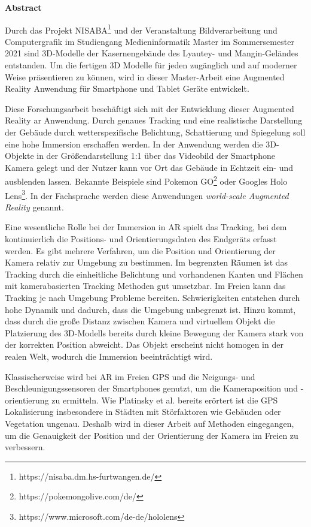 \begin{center}
    \Large
    \textbf{Abstract}
\end{center}

\noindent
Durch das Projekt NISABA\footnote{https://nisaba.dm.hs-furtwangen.de/} und der Veranstaltung Bildverarbeitung und Computergrafik im Studiengang Medieninformatik Master im Sommersemester 2021 sind 3D-Modelle der Kasernengebäude des Lyautey- und Mangin-Geländes entstanden. Um die fertigen 3D Modelle für jeden zugänglich und auf moderner Weise präsentieren zu können, wird in dieser Master-Arbeit eine Augmented Reality Anwendung für Smartphone und Tablet Geräte entwickelt.

Diese Forschungsarbeit beschäftigt sich mit der Entwicklung dieser Augmented Reality \acrshort{ar} Anwendung. Durch genaues Tracking und eine realistische Darstellung der Gebäude durch wetterspezifische Belichtung, Schattierung und Spiegelung soll eine hohe Immersion erschaffen werden. In der Anwendung werden die 3D-Objekte in der Größendarstellung 1:1 über das Videobild der Smartphone Kamera gelegt und der Nutzer kann vor Ort das Gebäude in Echtzeit ein- und ausblenden lassen. Bekannte Beispiele sind Pokemon GO\footnote{https://pokemongolive.com/de/} oder Googles Holo Lens\footnote{https://www.microsoft.com/de-de/hololens}. In der Fachsprache werden diese Anwendungen \textit{world-scale Augmented Reality} genannt.

Eine wesentliche Rolle bei der Immersion in AR spielt das Tracking, bei dem kontinuierlich die Positions- und Orientierungsdaten des Endgeräts erfasst werden. Es gibt mehrere Verfahren, um die Position und Orientierung der Kamera relativ zur Umgebung zu bestimmen. Im begrenzten Räumen ist das Tracking durch die einheitliche Belichtung und vorhandenen Kanten und Flächen mit kamerabasierten Tracking Methoden gut umsetzbar. Im Freien kann das Tracking je nach Umgebung Probleme bereiten. Schwierigkeiten entstehen durch hohe Dynamik und dadurch, dass die Umgebung unbegrenzt ist. Hinzu kommt, dass durch die große Distanz zwischen Kamera und virtuellem Objekt die Platzierung des 3D-Modells bereits durch kleine Bewegung der Kamera stark von der korrekten Position abweicht. Das Objekt erscheint nicht homogen in der realen Welt, wodurch die Immersion beeinträchtigt wird.

Klassischerweise wird bei AR im Freien GPS und die Neigungs- und Beschleunigungssensoren der Smartphones genutzt, um die Kameraposition und -orientierung zu ermitteln. Wie Platinsky et al.\cite*{platinsky} bereits erörtert ist die GPS Lokalisierung insbesondere in Städten mit Störfaktoren wie Gebäuden oder Vegetation ungenau. Deshalb wird in dieser Arbeit auf Methoden eingegangen, um die Genauigkeit der Position und der Orientierung der Kamera im Freien zu verbessern.

